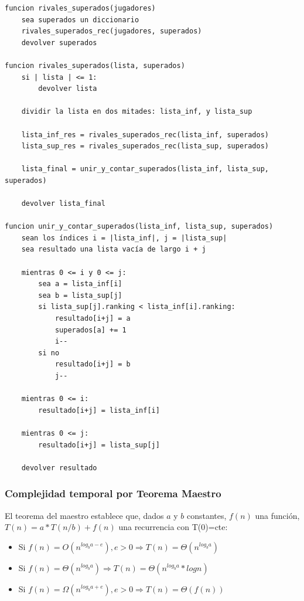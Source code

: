 \documentclass[titlepage,a4paper]{article}
\begin{document}
\begin{verbatim}
funcion rivales_superados(jugadores)
    sea superados un diccionario
    rivales_superados_rec(jugadores, superados)
    devolver superados

funcion rivales_superados(lista, superados)
    si | lista | <= 1:
        devolver lista

    dividir la lista en dos mitades: lista_inf, y lista_sup

    lista_inf_res = rivales_superados_rec(lista_inf, superados)
    lista_sup_res = rivales_superados_rec(lista_sup, superados)

    lista_final = unir_y_contar_superados(lista_inf, lista_sup, superados)

    devolver lista_final

funcion unir_y_contar_superados(lista_inf, lista_sup, superados)
    sean los índices i = |lista_inf|, j = |lista_sup|
    sea resultado una lista vacía de largo i + j
    
    mientras 0 <= i y 0 <= j:
        sea a = lista_inf[i]
        sea b = lista_sup[j]
        si lista_sup[j].ranking < lista_inf[i].ranking:
            resultado[i+j] = a
            superados[a] += 1
            i--
        si no
            resultado[i+j] = b
            j--

    mientras 0 <= i:
        resultado[i+j] = lista_inf[i]

    mientras 0 <= j:
        resultado[i+j] = lista_sup[j]

    devolver resultado
\end{verbatim}

\subsubsection{Complejidad temporal por Teorema Maestro}
\label{sec:org211bacf}

El teorema del maestro establece que, dados \(a\) y \(b\) constantes, \(f(n)\) una función, \(T(n) = a * T(n/b) + f(n)\) una recurrencia con T(0)=cte:
\begin{itemize}
\item Si \(f(n) = O(n^{log_b a - e}), e > 0 \Rightarrow T(n) = \Theta(n^{log_b a})\)
\item Si \(f(n) = \Theta(n^{log_b a}) \Rightarrow T(n) = \Theta(n^{log_b a} * log n)\)
\item Si \(f(n) = \Omega(n^{log_b a + e}), e > 0 \Rightarrow T(n) = \Theta(f(n))\)
\end{itemize}
\end{document}
